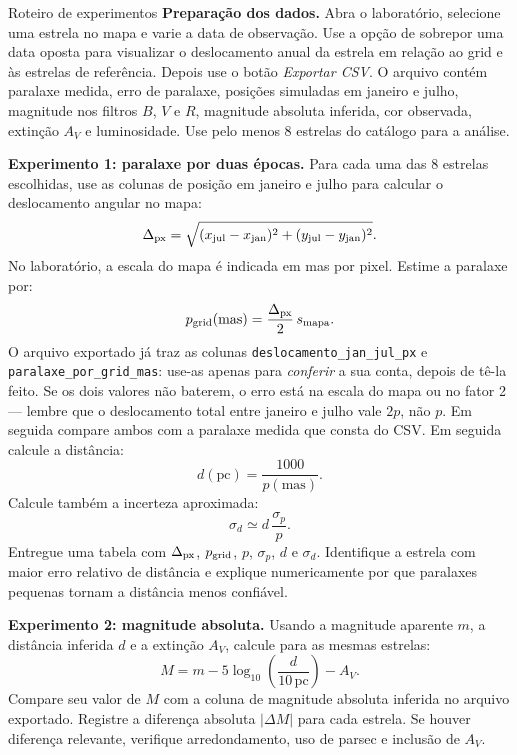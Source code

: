 \documentclass[11pt,a4paper]{article}
\begin{document}
\begin{lessonblock}[borderline west={2pt}{0pt}{astroGold}]{Roteiro de experimentos}
\textbf{Preparação dos dados.} Abra o laboratório, selecione uma estrela no mapa e varie a data de observação. Use a opção de sobrepor uma data oposta para visualizar o deslocamento anual da estrela em relação ao grid e às estrelas de referência. Depois use o botão \textit{Exportar CSV}. O arquivo contém paralaxe medida, erro de paralaxe, posições simuladas em janeiro e julho, magnitude nos filtros $B$, $V$ e $R$, magnitude absoluta inferida, cor observada, extinção $A_V$ e luminosidade. Use pelo menos 8 estrelas do catálogo para a análise.

\textbf{Experimento 1: paralaxe por duas épocas.}
Para cada uma das 8 estrelas escolhidas, use as colunas de posição em janeiro e julho para calcular o deslocamento angular no mapa:
\[
\Delta_{\rm px}=\sqrt{(x_{\rm jul}-x_{\rm jan})^2+(y_{\rm jul}-y_{\rm jan})^2}.
\]
No laboratório, a escala do mapa é indicada em mas por pixel. Estime a paralaxe por:
\[
p_{\rm grid}(\mathrm{mas})=\frac{\Delta_{\rm px}}{2}\,s_{\rm mapa}.
\]
O arquivo exportado já traz as colunas \texttt{deslocamento\_jan\_jul\_px} e \texttt{paralaxe\_por\_grid\_mas}: use-as apenas para \emph{conferir} a sua conta, depois de tê-la feito. Se os dois valores não baterem, o erro está na escala do mapa ou no fator 2 --- lembre que o deslocamento total entre janeiro e julho vale $2p$, não $p$. Em seguida compare ambos com a paralaxe medida que consta do CSV. Em seguida calcule a distância:
\[
d(\mathrm{pc})=\frac{1000}{p(\mathrm{mas})}.
\]
Calcule também a incerteza aproximada:
\[
\sigma_d\simeq d\,\frac{\sigma_p}{p}.
\]
Entregue uma tabela com $\Delta_{\rm px}$, $p_{\rm grid}$, $p$, $\sigma_p$, $d$ e $\sigma_d$. Identifique a estrela com maior erro relativo de distância e explique numericamente por que paralaxes pequenas tornam a distância menos confiável.

\textbf{Experimento 2: magnitude absoluta.}
Usando a magnitude aparente $m$, a distância inferida $d$ e a extinção $A_V$, calcule para as mesmas estrelas:
\[
M=m-5\log_{10}\left(\frac{d}{10\,\mathrm{pc}}\right)-A_V.
\]
Compare seu valor de $M$ com a coluna de magnitude absoluta inferida no arquivo exportado. Registre a diferença absoluta $|\Delta M|$ para cada estrela. Se houver diferença relevante, verifique arredondamento, uso de parsec e inclusão de $A_V$.


\end{lessonblock}
\end{document}
